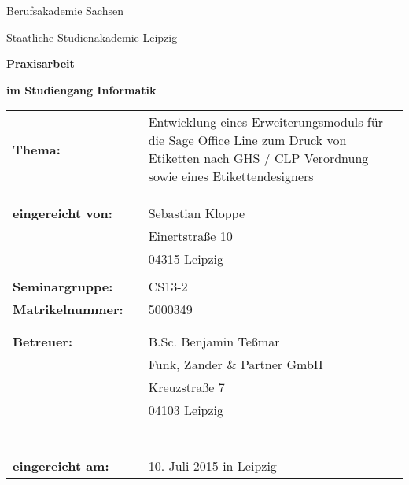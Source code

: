 \thispagestyle{empty}
\begin{center}
\Large{Berufsakademie Sachsen}
\end{center}
 
\begin{center}
\Large{Staatliche Studienakademie Leipzig}
\end{center}
\hspace{4cm}

\begin{center}
\textbf{\LARGE{Praxisarbeit}}
\end{center}

\begin{center}
\textbf{im Studiengang Informatik}
\end{center}
\hspace{4cm}

\begin{flushleft}
\begin{tabular}{l p{10pt} p{290pt}}
\\
\textbf{Thema:} & &  Entwicklung eines Erweiterungsmoduls für die Sage Office Line
zum Druck von Etiketten nach GHS / CLP Verordnung sowie eines Etikettendesigners\\
& & \\
& & \\
& & \\
\textbf{eingereicht von:} & & Sebastian Kloppe \\
& &                           Einertstraße 10\\
& &                           04315 Leipzig\\
& & \\
\textbf{Seminargruppe:} & & CS13-2 \\
\textbf{Matrikelnummer:} & & 5000349\\
& & \\
& & \\
\textbf{Betreuer:} & & B.Sc. Benjamin Teßmar\\
& &                    Funk, Zander \& Partner GmbH\\
& &                    Kreuzstraße 7\\
& &                    04103 Leipzig\\
& & \\
& & \\
& & \\
& & \\
& & \\
& & \\
& & \\
\textbf{eingereicht am:} & & 10. Juli 2015 in Leipzig\\
\end{tabular}
\end{flushleft}
